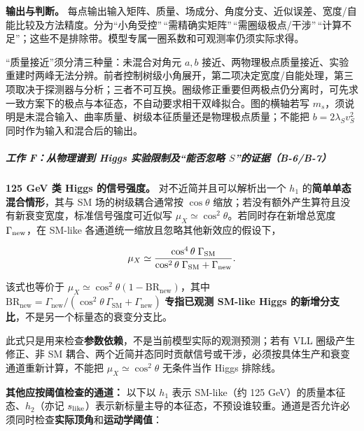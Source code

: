 \documentclass[
  chinese,
  UTF8]{ctexart}
\begin{document}
\textbf{输出与判断。}
每点输出输入矩阵、质量、场成分、角度分支、近似误差、宽度/自能比较及方法精度。分为``小角受控''\,``需精确实矩阵''\,``需圈级极点/干涉''\,``计算不足''；这些不是排除带。模型专属一圈系数和可观测率仍须实际求得。

``质量接近''须分清三种量：未混合对角元 \(a,b\)
接近、两物理极点质量接近、实验重建时两峰无法分辨。前者控制树级小角展开，第二项决定宽度/自能处理，第三项取决于探测器与分析；三者不可互换。圈级修正重要但两极点仍分离时，可先求一致方案下的极点与本征态，不自动要求相干双峰拟合。图的横轴若写
\(m_s\)，须说明是未混合输入、曲率质量、树级本征质量还是物理极点质量；不能把
\(b=2\lambda_Sv_S^2\) 同时作为输入和混合后的输出。

\subparagraph{\texorpdfstring{工作 F：从物理谱到 Higgs
实验限制及``能否忽略
\(S\)''的证据（B-6/B-7）}{工作 F：从物理谱到 Higgs 实验限制及``能否忽略 S''的证据（B-6/B-7）}}\label{ux5de5ux4f5c-fux4eceux7269ux7406ux8c31ux5230-higgs-ux5b9eux9a8cux9650ux5236ux53caux80fdux5426ux5ffdux7565-sux7684ux8bc1ux636eb-6b-7}

\textbf{125 GeV 类 Higgs 的信号强度。} 对不近简并且可以解析出一个
\(h_1\) 的\textbf{简单单态混合情形}，其与 SM 场的树级耦合通常按
\(\cos\theta\)
缩放；若没有额外产生算符且没有新衰变宽度，标准信号强度可近似写
\(\mu_X\simeq\cos^2\theta\)。若同时存在新增总宽度
\(\Gamma_{\rm new}\)，在 SM-like
各通道统一缩放且忽略其他新效应的假设下，

\[
 \mu_X\simeq\frac{\cos^4\theta\;\Gamma_{\rm SM}}
 {\cos^2\theta\;\Gamma_{\rm SM}+\Gamma_{\rm new}}.
\]

该式也等价于
\(\mu_X\simeq\cos^2\theta(1-\mathrm{BR}_{\mathrm{new}})\)，其中
\(\mathrm{BR}_{\mathrm{new}}=\Gamma_{\mathrm{new}}/(\cos^2\theta\,\Gamma_{\mathrm{SM}}+\Gamma_{\mathrm{new}})\)
\textbf{专指已观测 SM-like Higgs
的新增分支比}，不是另一个标量态的衰变分支比。

此式只是用来检查\textbf{参数依赖}，不是当前模型实际的观测预测；若有 VLL
圈级产生修正、非 SM
耦合、两个近简并态同时贡献信号或干涉，必须按具体生产和衰变通道重新计算，不能把
\(\mu_X\simeq\cos^2\theta\) 无条件当作 Higgs 排除线。

\textbf{其他应按阈值检查的通道：} 以下以 \(h_1\) 表示 SM-like（约 125
GeV）的质量本征态、\(h_2\)（亦记
\(s_{\rm like}\)）表示新标量主导的本征态，不预设谁较重。通道是否允许必须同时检查\textbf{实际顶角}和\textbf{运动学阈值}：
\end{document}
